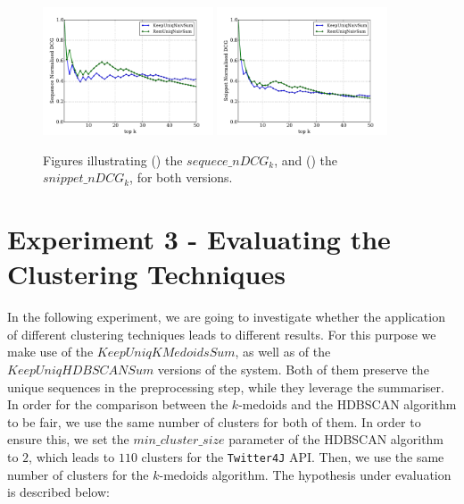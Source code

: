 \begin{figure}[H]
\ffigbox
{%
  \begin{subfloatrow}[2]
  \ffigbox[\FBwidth]
    {\caption{}\label{res:exp2-sequence-ndcg}}
    {\includegraphics[width=0.45\textwidth]{results/exp2-sequence-ndcg.pdf}}
  \hspace{1em}%
  \ffigbox[\FBwidth]
    {\caption{}\label{res:exp2-snippet-ndcg}}
    {\includegraphics[width=0.45\textwidth]{results/exp2-snippet-ndcg.pdf}}
  \end{subfloatrow}}
  {\caption[Illustration of the $nDCG_k$ metric\protect\\($RemUniqNaivSum$, $RemUniqNaivSum$)]{Figures illustrating () the $sequece\_nDCG_k$, and () the $snippet\_nDCG_k$, for both versions.}
\label{res:exp2-ndcg}}
\end{figure}
\vspace{-30pt}

\section{Experiment 3 - Evaluating the Clustering Techniques}
\label{sec:evaluation-exp3}

In the following experiment, we are going to investigate whether the application of different clustering techniques leads to different results. For this purpose we make use of the $KeepUniqKMedoidsSum$, as well as of the $KeepUniqHDBSCANSum$ versions of the system. Both of them preserve the unique sequences in the preprocessing step, while they leverage the summariser. In order for the comparison between the $k$-medoids and the HDBSCAN algorithm to be fair, we use the same number of clusters for both of them. In order to ensure this, we set the $min\_cluster\_size$ parameter of the HDBSCAN algorithm to $2$, which leads to $110$ clusters for the \texttt{Twitter4J} API. Then, we use the same number of clusters for the $k$-medoids algorithm. The hypothesis under evaluation is described below:

